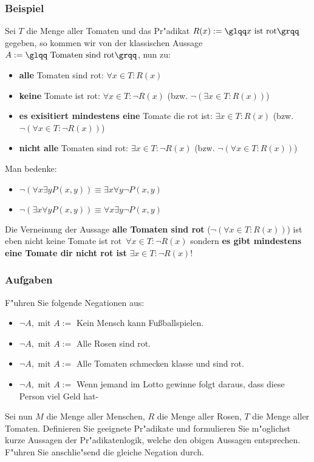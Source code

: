 \subsubsection*{Beispiel}
Sei $T$ die Menge aller Tomaten und das Pr"adikat $R(x):= \text{\glqq}x \text{ ist rot\grqq}$ gegeben, so kommen wir von der klassischen Aussage $A := \text{\glqq Tomaten sind rot\grqq}$, nun zu:
\begin{itemize}
\item \glqq\textbf{alle} Tomaten sind rot\grqq : $\forall x \in T : R(x)$
\item \glqq\textbf{keine} Tomate ist rot\grqq : $\forall x \in T : \neg R(x)$ (bzw. $\neg (\exists x \in T : R(x))$)
\item \glqq\textbf{es exisitiert mindestens eine} Tomate die rot ist\grqq : $\exists x \in T : R(x)$ (bzw. $\neg (\forall x \in T : \neg R(x))$)
\item \glqq\textbf{nicht alle} Tomaten sind rot\grqq : $\exists x \in T : \neg R(x)$ (bzw. $\neg (\forall x \in T : R(x))$)
\end{itemize}
Man bedenke:
\begin{itemize}
\item $ \neg (\forall x \exists y P(x, y)) \equiv \exists x \forall y \neg P(x, y)$
\item $ \neg (\exists x \forall y P(x, y)) \equiv \forall x \exists y \neg P(x, y)$
\end{itemize}
Die Verneinung der Aussage \textbf{\glqq alle Tomaten sind rot\grqq} ($\neg (\forall x \in T : R(x))$) ist eben nicht \glqq keine Tomate ist rot\grqq \ $\forall x \in T : \neg R(x)$ sondern \textbf{\glqq es gibt mindestens eine Tomate dir nicht rot ist\grqq} $ \exists x \in T : \neg R(x)$!

\subsubsection{Aufgaben}
F"uhren Sie folgende Negationen aus:
\begin{itemize}
	\item $\neg A, \text{ mit } A:= $ Kein Mensch kann Fu{\ss}ballspielen.
	\item $\neg A, \text{ mit } A := $ Alle Rosen sind rot.
	\item $\neg A, \text{ mit } A := $ Alle Tomaten schmecken klasse und sind rot.
	\item $\neg A, \text{ mit } A := $ Wenn jemand im Lotto gewinne folgt daraus, dass diese Person viel Geld hat-
\end{itemize}
Sei nun $M$ die Menge aller Menschen, $R$ die Menge aller Rosen, $T$ die Menge aller Tomaten. Definieren Sie geeignete Pr"adikate und formulieren Sie m"oglichst kurze Aussagen der Pr"adikatenlogik, welche den obigen Aussagen entsprechen. F"uhren Sie anschlie"send die gleiche Negation durch.